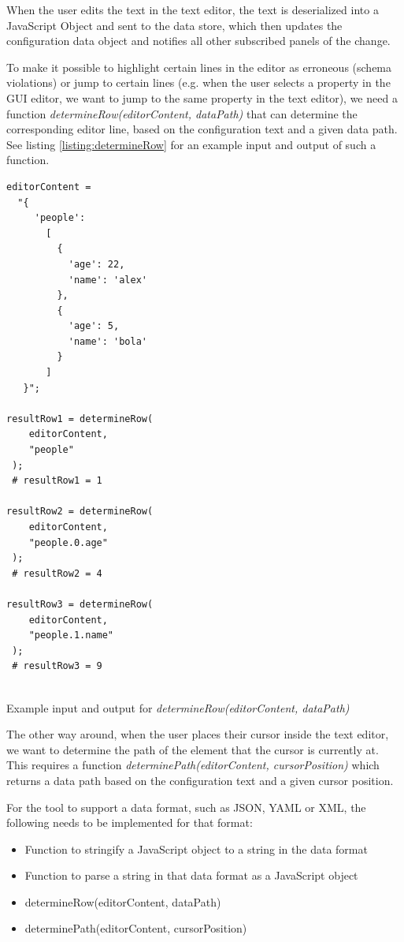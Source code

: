 When the user edits the text in the text editor, the text is deserialized into a JavaScript Object and sent to the data store, which then updates the configuration data object and notifies all other subscribed panels of the change.

To make it possible to highlight certain lines in the editor as erroneous (schema violations) or jump to certain lines (e.g. when the user selects a property in the GUI editor, we want to jump to the same property in the text editor), we need a function \textit{determineRow(editorContent, dataPath)} that can determine the corresponding editor line, based on the configuration text and a given data path. See listing \ref{listing:determineRow} for an example input and output of such a function.

\begin{listing}[!h]
    \begin{verbatim}
editorContent = 
  "{
     'people':
       [
         { 
           'age': 22, 
           'name': 'alex' 
         },
         { 
           'age': 5, 
           'name': 'bola' 
         }
       ]
   }";
   
resultRow1 = determineRow(
	editorContent,
	"people"
 );
 # resultRow1 = 1 
 
resultRow2 = determineRow(
	editorContent,
	"people.0.age"
 );
 # resultRow2 = 4
 
resultRow3 = determineRow(
	editorContent,
	"people.1.name"
 );
 # resultRow3 = 9
 
    \end{verbatim}
    \caption{Example input and output for \textit{determineRow(editorContent, dataPath)}}
    \label{listing:determineRow}
\end{listing}

The other way around, when the user places their cursor inside the text editor, we want to determine the path of the element that the cursor is currently at. This requires a function \textit{determinePath(editorContent, cursorPosition)} which returns a data path based on the configuration text and a given cursor position.

For the tool to support a data format, such as JSON, YAML or XML, the following needs to be implemented for that format:
\begin{itemize}
	\item Function to stringify a JavaScript object to a string in the data format
	\item Function to parse a string in that data format as a JavaScript object
	\item determineRow(editorContent, dataPath) 
	\item determinePath(editorContent, cursorPosition)
\end{itemize}

